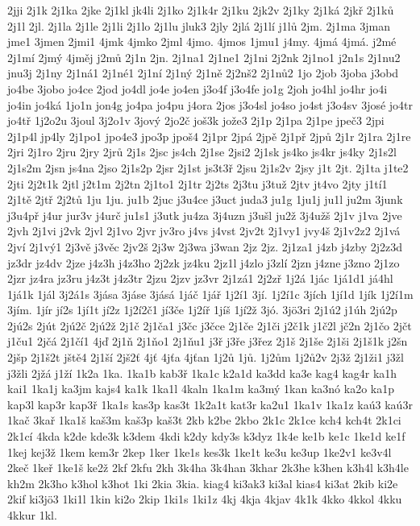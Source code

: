 {2jji
2j1k
2j1ka
2jke
2j1kl
jk4li
2j1ko
2j1k4r
2j1ku
2jk2v
2j1ky
2j1ká
2jkř
2j1ků
2j1l
2jl.
2j1la
2j1le
2j1li
2j1lo
2j1lu
jluk3
2jly
2jlá
2j1lí
j1lů
2jm.
2j1ma
3jman
jme1
3jmen
2jmi1
4jmk
4jmko
2jml
4jmo.
4jmos
1jmu1
j4my.
4jmá
4jmá.
j2mé
2j1mí
2jmý
4jměj
j2mů
2j1n
2jn.
2j1na1
2j1ne1
2j1ni
2j2nk
2j1no1
j2n1s
2j1nu2
jnu3j
2j1ny
2j1ná1
2j1né1
2j1ní
2j1ný
2j1ně
2j2nš2
2j1nů2
1jo
2job
3joba
j3obd
jo4be
3jobo
jo4ce
2jod
jo4dl
jo4e
jo4en
j3o4f
j3o4fe
jo1g
2joh
jo4hl
jo4hr
jo4i
jo4in
jo4ká
1jo1n
jon4g
jo4pa
jo4pu
j4ora
2jos
j3o4sl
jo4so
jo4st
j3o4sv
3josé
jo4tr
jo4tř
1j2o2u
3joul
3j2o1v
3jový
2jo2č
još3k
jože3
2j1p
2j1pa
2j1pe
jpeč3
2jpi
2j1p4l
jp4ly
2j1po1
jpo4e3
jpo3p
jpoš4
2j1pr
2jpá
2jpě
2j1př
2jpů
2j1r
2j1ra
2j1re
2jri
2j1ro
2jru
2jry
2jrů
2j1s
2jsc
js4ch
2j1se
2jsi2
2j1sk
js4ko
js4kr
js4ky
2j1s2l
2j1s2m
2jsn
js4na
2jso
2j1s2p
2jsr
2j1st
js3t3ř
2jsu
2j1s2v
2jsy
j1t
2jt.
2j1ta
j1te2
2jti
2j2t1k
2jtl
j2t1m
2j2tn
2j1to1
2j1tr
2j2ts
2j3tu
j3tuž
2jtv
jt4vo
2jty
j1tí1
2j1tě
2jtř
2j2tů
1ju
1ju.
ju1b
2juc
j3u4ce
j3uct
juda3
ju1g
1ju1j
ju1l
ju2m
3junk
j3u4př
j4ur
jur3v
j4urč
ju1s1
j3utk
ju4za
3j4uzn
j3ušl
ju2ž
3j4užš
2j1v
j1va
2jve
2jvh
2j1vi
j2vk
2jvl
2j1vo
2jvr
jv3ro
j4vs
j4vst
2jv2t
2j1vy1
jvy4š
2j1v2z2
2j1vá
2jví
2j1vý1
2j3vě
j3věc
2jv2š
2j3w
2j3wa
j3wan
2jz
2jz.
2j1za1
j4zb
j4zby
2j2z3d
jz3dr
jz4dv
2jze
j4z3h
j4z3ho
2j2zk
jz4ku
2jz1l
j4zlo
j3zlí
2jzn
j4zne
j3zno
2j1zo
2jzr
jz4ra
jz3ru
j4z3t
j4z3tr
2jzu
2jzv
jz3vr
2j1zá1
2j2zř
1j2á
1jác
1já1d1
já4hl
1já1k
1jál
3j2á1s
3jása
3jáse
3jásá
1jáč
1jář
1j2í1
3jí.
1j2í1c
3jích
1jí1d
1jík
1j2í1m
3jím.
1jír
jí2s
1jí1t
jí2z
1j2í2č1
jí3če
1j2íř
1jíš
1jí2ž
3jó.
3jö3ri
2j1ú2
j1úh
2jú2p
2jú2s
2jút
2jú2č
2jú2ž
2j1č
2j1ča1
j3čc
j3čce
2j1če
2j1či
j2č1k
j1č2l
jč2n
2j1čo
2jčt
j1ču1
2jčá
2j1čí1
4jď
2j1ň
2j1ňo1
2j1ňu1
j3ř
j3ře
j3řez
2j1š
2j1še
2j1ši
2j1š1k
j2šn
2jšp
2j1š2t
jště4
2j1ší
2jš2ť
4jť
4jťa
4jťan
1j2ů
1jů.
1j2ům
1j2ů2v
2j3ž
2j1ži1
j3žl
j3žli
2jžá
j1ží
1k2a
1ka.
1ka1b
kab3ř
1ka1c
k2a1d
ka3dd
ka3e
kag4
kag4r
ka1h
kai1
1ka1j
ka3jm
kajs4
ka1k
1ka1l
4kaln
1ka1m
ka3mý
1kan
ka3nó
ka2o
ka1p
kap3l
kap3r
kap3ř
1ka1s
kas3p
kas3t
1k2a1t
kat3r
ka2u1
1ka1v
1ka1z
kaú3
kaú3r
1kač
3kař
1ka1š
kaš3m
kaš3p
kaš3t
2kb
k2be
2kbo
2k1c
2k1ce
kch4
kch4t
2k1ci
2k1cí
4kda
k2de
kde3k
k3dem
4kdi
k2dy
kdy3s
k3dyz
1k4e
ke1b
ke1c
1ke1d
ke1f
1kej
kej3ž
1kem
kem3r
2kep
1ker
1ke1s
kes3k
1ke1t
ke3u
ke3up
1ke2v1
ke3v4l
2keč
1keř
1ke1š
ke2ž
2kf
2kfu
2kh
3k4ha
3k4han
3khar
2k3he
k3hen
k3h4l
k3h4le
kh2m
2k3ho
k3hol
k3hot
1ki
2kia
3kia.
kiag4
ki3ak3
ki3al
kias4
ki3at
2kib
ki2e
2kif
ki3jö3
1ki1l
1kin
ki2o
2kip
1ki1s
1ki1z
4kj
4kja
4kjav
4k1k
4kko
4kkol
4kku
4kkur
1kl.
}
